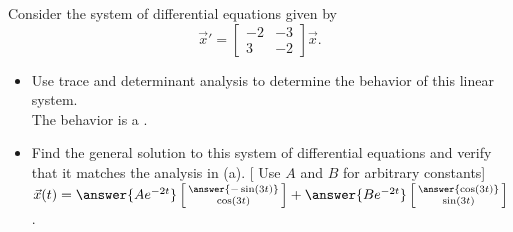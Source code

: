 \documentclass{ximera}
\begin{document}
\begin{exercise}
    Consider the system of differential equations given by 
    \begin{equation*}
        {\vec{x}}'  = \begin{bmatrix} -2 & -3 \\ 3 & -2 \end{bmatrix} \vec{x}.
    \end{equation*}
    \begin{itemize}
        \item Use trace and determinant analysis to determine the behavior of this linear system. \\
        The behavior is a  .
        \item Find the general solution to this system of differential equations and verify that it matches the analysis in (a). [ Use $A$ and $B$ for arbitrary constants]\\
        $\vec{x}(t) = \answer{Ae^{-2t}}\left[\begin{smallmatrix} \answer{-\sin(3t)} \\ \cos(3t) \end{smallmatrix}\right] + \answer{Be^{-2t}} \left[\begin{smallmatrix} \answer{\cos(3t)} \\ \sin(3t) \end{smallmatrix}\right]$.
    \end{itemize}
\end{exercise}
\end{document}
